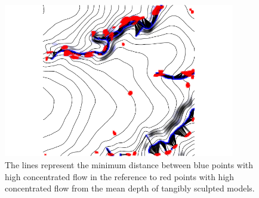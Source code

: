 \documentclass{isprs}
\begin{document}
\begin{figure}
\begin{center}
\includegraphics[width=0.9\textwidth]{figures/concentrated_flow_2.png}
\caption{
The lines represent the minimum distance between blue points with high concentrated flow in the reference to red points with high concentrated flow from the mean depth of tangibly sculpted models.}
\label{fig:distance_2}
\end{center}
\end{figure}

 
\end{document}
